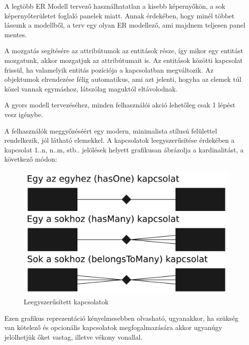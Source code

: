 \documentclass[a4paper,12pt,oneside]{report}
\begin{document}
\begin{justify}

	A legtöbb ER Modell tervező használhatatlan a kisebb képernyőkön, a sok képernyőterületet foglaló panelek miatt. Annak érdekében, hogy minél többet lássunk a modellből, a terv egy olyan ER modellező, ami majdnem teljesen panel mentes. 

	A mozgatás segítésére az attribútumok az entitások része, így mikor egy entitást mozgatunk, akkor mozgatjuk az attribútumait is. Az entitások közötti kapcsolat frissül, ha valamelyik entitás pozíciója a kapcsolatban megváltozik. Az objektumok elrendezése félig automatikus, ami azt jelenti, hogyha az elemek túl közel vannak egymáshoz, látszólag maguktól eltávolodnak.

	A gyors modell tervezéséhez, minden felhasználói akció lehetőleg csak 1 lépést vesz igénybe.

	A felhasználók meggyőzéséért egy modern, minimalista stílusú felülettel rendelkezik, jól látható elemekkel. A kapcsolatok leegyszerűsítése érdekében a kapcsolat 1..n, n..m, stb.. jelölések helyett grafikusan ábrázolja a kardinalitást, a következő módon:

	\begin{figure}[h]
		\includegraphics[width=\textwidth]{contents/images/simplified_relations.png}
		\caption{Leegyszerűsített kapcsolatok}
		\label{fig:simplified_relations}
	\end{figure}

	Ezen grafikus reprezentáció kényelmesebben olvasható, ugyanakkor, ha szükség van kötelező és opcionális kapcsolatok megfogalmazására akkor ugyanúgy jelölhetjük őket vastag, illetve vékony vonallal. 

\end{justify}
\end{document}
